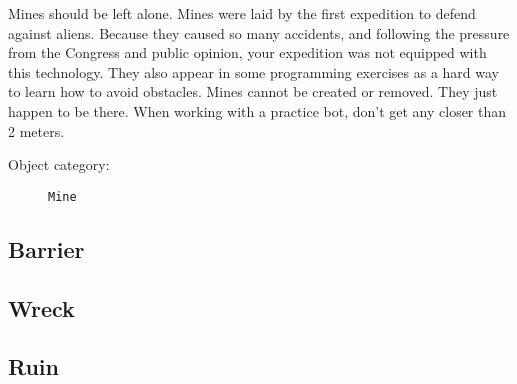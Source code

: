Mines should be left alone.
Mines were laid by the first expedition to defend against aliens. Because they caused so
many accidents, and following the pressure from the Congress and public opinion, your
expedition was not equipped with this technology.
They also appear in some programming exercises as a hard way to learn how to avoid obstacles. Mines
cannot be created or removed. They just happen to be there.
When working with a practice bot, don't get any closer than 2 meters.

\begin{description}
    \item[Object category:] \texttt{Mine}
\end{description}


\subsection{Barrier}



\subsection{Wreck}



\subsection{Ruin}


